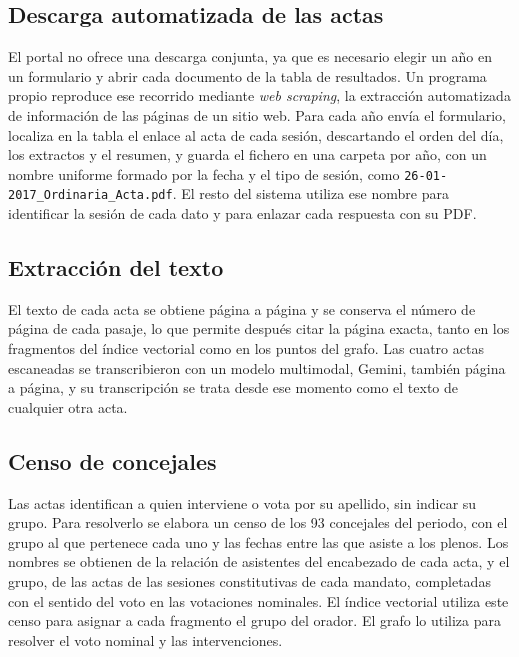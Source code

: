 \documentclass[11pt, a4paper]{report}
\begin{document}
	\subsection{Descarga automatizada de las actas}

	El portal no ofrece una descarga conjunta, ya que es necesario elegir un año en un
	formulario y abrir cada documento de la tabla de resultados. Un programa
	propio reproduce ese recorrido mediante \textit{web scraping},
	la extracción automatizada de información de las páginas de un sitio web. Para cada año envía el formulario, localiza en
	la tabla el enlace al acta de cada sesión, descartando el orden del día, los
	extractos y el resumen, y guarda el fichero en una carpeta por año, con un
	nombre uniforme formado por la fecha y el tipo de sesión, como
	\texttt{26-01-2017\_Ordinaria\_Acta.pdf}. El resto del sistema utiliza ese
	nombre para identificar la sesión de cada dato y para enlazar cada respuesta
	con su PDF.

	\subsection{Extracción del texto}

	El texto de cada acta se obtiene página a página y se conserva el número de
	página de cada pasaje, lo que permite después citar la página exacta, tanto en
	los fragmentos del índice vectorial como en los puntos del grafo. Las cuatro
	actas escaneadas se transcribieron con un modelo multimodal, Gemini, también
	página a página, y su transcripción se trata desde ese momento como el texto
	de cualquier otra acta.

	\subsection{Censo de concejales}

	Las actas identifican a quien interviene o vota por su apellido, sin indicar
	su grupo. Para resolverlo se elabora un censo de los 93 concejales del
	periodo, con el grupo al que pertenece cada uno y las fechas entre las que
	asiste a los plenos. Los nombres se obtienen de la relación de asistentes del
	encabezado de cada acta, y el grupo, de las actas de las sesiones
	constitutivas de cada mandato, completadas con el sentido del voto en las
	votaciones nominales. El índice vectorial utiliza este censo para asignar a
	cada fragmento el grupo del orador. El grafo lo utiliza para resolver el voto
	nominal y las intervenciones.
\end{document}
